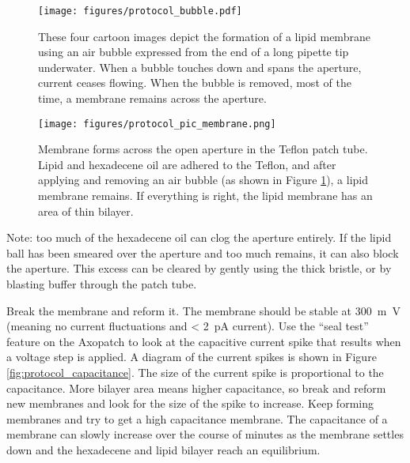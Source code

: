 \begin{figure}[h]
\begin{centering}
\texttt{[image: figures/protocol\_bubble.pdf]}
\caption[Establishing a lipid membrane with a bubble]{These four cartoon images depict the formation of a lipid membrane using an air bubble expressed from the end of a long pipette tip underwater.  When a bubble touches down and spans the aperture, current ceases flowing.  When the bubble is removed, most of the time, a membrane remains across the aperture.}
\label{fig:protocol_bubble}
\end{centering}
\end{figure}

\begin{figure}[h]
\begin{centering}
\texttt{[image: figures/protocol\_pic\_membrane.png]}
\caption[Diagram of membrane on Teflon patch tube]{Membrane forms across the open aperture in the Teflon patch tube.  Lipid and hexadecene oil are adhered to the Teflon, and after applying and removing an air bubble (as shown in Figure \ref{fig:protocol_bubble}), a lipid membrane remains.  If everything is right, the lipid membrane has an area of thin bilayer.}
\label{fig:protocol_membrane}
\end{centering}
\end{figure}

Note: too much of the hexadecene oil can clog the aperture entirely.  If the lipid ball has been smeared over the aperture and too much remains, it can also block the aperture.  This excess can be cleared by gently using the thick bristle, or by blasting buffer through the patch tube.

Break the membrane and reform it.  The membrane should be stable at \SI{300}{\m\V} (meaning no current fluctuations and < \SI{2}{\pA} current).  Use the ``seal test” feature on the Axopatch to look at the capacitive current spike that results when a voltage step is applied.  A diagram of the current spikes is shown in Figure \ref{fig:protocol_capacitance}.  The size of the current spike is proportional to the capacitance.  More bilayer area means higher capacitance, so break and reform new membranes and look for the size of the spike to increase.  Keep forming membranes and try to get a high capacitance membrane.  The capacitance of a membrane can slowly increase over the course of minutes as the membrane settles down and the hexadecene and lipid bilayer reach an equilibrium.

